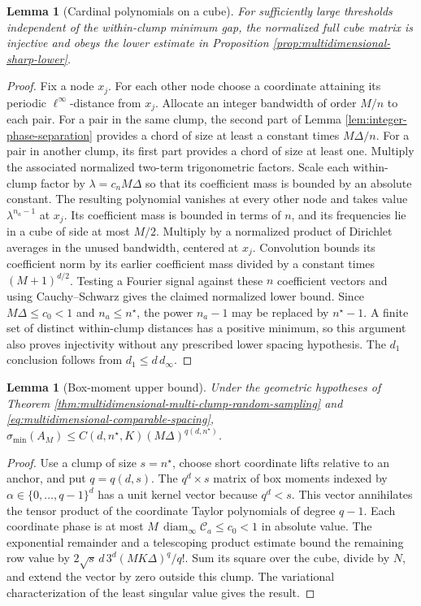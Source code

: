 \documentclass[11pt]{article}
\newtheorem{lemma}[theorem]{Lemma}
\theoremstyle{definition}\newtheorem{definition}[theorem]{Definition}
\theoremstyle{remark}\newtheorem{remark}[theorem]{Remark}
\begin{document}
\begin{lemma}[Cardinal polynomials on a cube]\label{lem:cube-cardinal-lower}
For sufficiently large thresholds independent of the within-clump minimum
gap, the normalized full cube matrix is injective and obeys the lower
estimate in Proposition \ref{prop:multidimensional-sharp-lower}.
\end{lemma}
\begin{proof}
Fix a node $x_j$. For each other node choose a coordinate attaining its
periodic $\ell^\infty$-distance from $x_j$. Allocate an integer bandwidth
of order $M/n$ to each pair. For a pair in the same clump, the second part
of Lemma \ref{lem:integer-phase-separation} provides a chord of size at
least a constant times $M\Delta/n$. For a pair in another clump, its first
part provides a chord of size at least one.
Multiply the associated normalized two-term trigonometric factors. Scale
each within-clump factor by $\lambda=c_nM\Delta$ so that its coefficient
mass is bounded by an absolute constant. The resulting polynomial vanishes
at every other node and takes value $\lambda^{n_a-1}$ at $x_j$. Its
coefficient mass is bounded in terms of $n$, and its frequencies lie in a
cube of side at most $M/2$.
Multiply by a normalized product of Dirichlet averages in the unused
bandwidth, centered at $x_j$. Convolution bounds its coefficient norm by
its earlier coefficient mass divided by a constant times $(M+1)^{d/2}$.
Testing a Fourier signal against these $n$ coefficient vectors and using
Cauchy--Schwarz gives the claimed normalized lower bound. Since
$M\Delta\le c_0<1$ and $n_a\le n^\star$, the power $n_a-1$ may be
replaced by $n^\star-1$. A finite set of distinct within-clump distances
has a positive minimum, so this argument also proves injectivity without
any prescribed lower spacing hypothesis. The $d_1$ conclusion follows
from $d_1\le d\,d_\infty$.
\end{proof}

\begin{lemma}[Box-moment upper bound]\label{lem:box-moment-upper}
Under the geometric hypotheses of Theorem
\ref{thm:multidimensional-multi-clump-random-sampling} and
\eqref{eq:multidimensional-comparable-spacing},
$\sigma_{\min}(A_M)\le C(d,n^\star,K)(M\Delta)^{q(d,n^\star)}$.
\end{lemma}
\begin{proof}
Use a clump of size $s=n^\star$, choose short coordinate lifts relative
to an anchor, and put $q=q(d,s)$. The $q^d\times s$ matrix of box moments
indexed by $\alpha\in\{0,\ldots,q-1\}^d$ has a unit kernel vector because
$q^d<s$. This vector annihilates the tensor product of the coordinate
Taylor polynomials of degree $q-1$.
Each coordinate phase is at most $M\,\operatorname{diam}_\infty\mathcal C_a
\le c_0<1$ in absolute value. The exponential remainder and a telescoping
product estimate bound the remaining row value by
$2\sqrt{s}\,d\,3^d(MK\Delta)^q/q!$. Sum its square over the cube, divide
by $N$, and extend the vector by zero outside this clump. The variational
characterization of the least singular value gives the result.
\end{proof}
\end{document}

